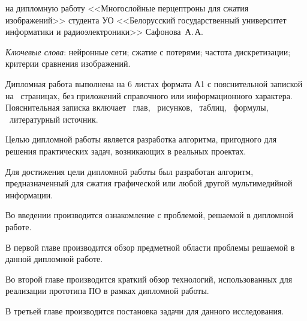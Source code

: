 \thispagestyle{empty}

\begin{center}
  \begin{minipage}{0.82\textwidth}
    на дипломную работу <<Многослойные перцептроны для сжатия изображений>> студента УО <<Белорусский государственный университет информатики и радиоэлектроники>> Сафонова~А.\,А.
  \end{minipage}
\end{center}

\emph{Ключевые слова}: нейронные сети; сжатие с потерями; частота дискретизации; критерии сравнения изображений.

\vspace{4\parsep}

Дипломная работа выполнена на 6 листах формата А1 с пояснительной запиской на~\pageref*{LastPage} страницах, без приложений справочного или информационного характера.
Пояснительная записка включает ~глав, \totfig{}~рисунков, \tottab{}~таблиц, \toteq{}~формулы, \totref{}~литературный источник.

Целью дипломной работы является разработка алгоритма, пригодного для решения практических задач, возникающих в реальных проектах.%

Для достижения цели дипломной работы был разработан алгоритм, предназначенный для сжатия графической или любой другой мультимедийной информации.

Во введении производится ознакомление с проблемой, решаемой в дипломной работе.

В первой главе производится обзор предметной области проблемы решаемой в данной дипломной работе.

Во второй главе производится краткий обзор технологий, использованных для реализации прототипа ПО в рамках дипломной работы.

В третьей главе производится постановка задачи для данного исследования.

